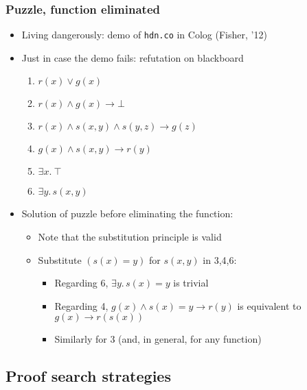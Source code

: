 \documentclass[handout,11pt]{beamer}
\newcommand{\imp}{\rightarrow}
\begin{document}
\begin{frame}
\frametitle{Puzzle, function eliminated}
 \begin{itemize}[<+->]
    \item Living dangerously: demo of {\tt hdn.co} in Colog (Fisher, '12)
    \item Just in case the demo fails: refutation on blackboard
    \begin{enumerate}
      \item $r(x) \vee g(x)$ 
      \item $r(x) \wedge g(x) \imp \bot$
      \item $r(x) \wedge s(x,y) \wedge s(y,z) \imp g(z)$ 
      \item $g(x) \wedge s(x,y) \imp r(y)$    
      \item $\exists x.~\top$
      \item $\exists y.\,s(x,y)$
  \end{enumerate}
  \item Solution of puzzle before eliminating 
  the function:
    \begin{itemize}
    \item Note that the substitution principle is valid
    \item Substitute $(s(x) = y)$ for $s(x,y)$ in 3,4,6:
     \begin{itemize}
     \item Regarding 6, $\exists y.\,s(x)=y$ is trivial   
     \item Regarding 4, $g(x) \wedge s(x)=y \imp r(y)$ is 
     equivalent to $g(x) \imp r(s(x))$
     \item Similarly for 3 (and, in general, for any function)   
     \end{itemize}
    \end{itemize}
  \end{itemize}
\end{frame}

\subsection{Proof search strategies}
\end{document}
